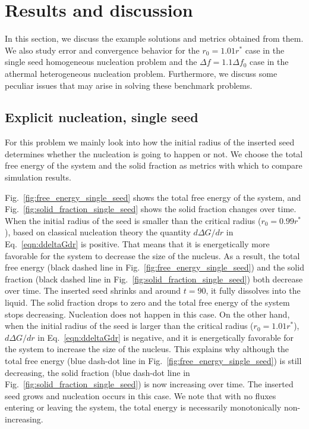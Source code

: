 \documentclass[preprint,12pt]{elsarticle}
\begin{document}
\section{Results and discussion}

In this section, we discuss the example solutions and metrics obtained from them. We also study error and convergence behavior for the $r_0=1.01r^*$ case in the single seed homogeneous nucleation problem and the $\Delta f=1.1\Delta f_0$ case in the athermal heterogeneous nucleation problem. Furthermore, we discuss some peculiar issues that may arise in solving these benchmark problems.


\subsection{Explicit nucleation, single seed}

For this problem we mainly look into how the initial radius of the inserted seed determines whether the nucleation is going to happen or not. We choose the total free energy of the system and the solid fraction as metrics with which to compare simulation results. 

Fig.~\ref{fig:free_energy_single_seed} shows the total free energy of the system, and Fig.~\ref{fig:solid_fraction_single_seed} shows the solid fraction changes over time. When the initial radius of the seed is smaller than the critical radius ($r_0=0.99r^*$), based on classical nucleation theory the quantity $d\Delta G/dr$ in Eq.~\ref{eqn:ddeltaGdr} is positive. That means that it is energetically more favorable for the system to decrease the size of the nucleus. As a result, the total free energy (black dashed line in Fig.~\ref{fig:free_energy_single_seed}) and the solid fraction (black dashed line in Fig.~\ref{fig:solid_fraction_single_seed}) both decrease over time. The inserted seed shrinks and around $t=90$, it fully dissolves into the liquid. The solid fraction drops to zero and the total free energy of the system stops decreasing. Nucleation does not happen in this case. 
On the other hand, when the initial radius of the seed is larger than the critical radius ($r_0=1.01r^*$), $d\Delta G/dr$ in Eq.~\ref{eqn:ddeltaGdr} is negative, and it is energetically favorable for the system to increase the size of the nucleus. This explains why  although the total free energy (blue dash-dot line in Fig.~\ref{fig:free_energy_single_seed}) is still decreasing, the solid fraction (blue dash-dot line in Fig.~\ref{fig:solid_fraction_single_seed}) is now increasing over time. The inserted seed grows and nucleation occurs in this case. We note that with no fluxes entering or leaving the system, the total energy is necessarily monotonically non-increasing.
\end{document}
